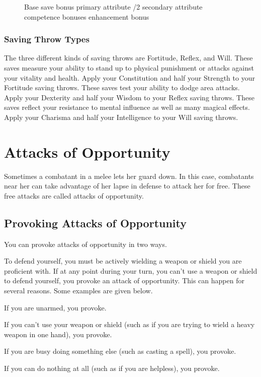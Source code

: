 \begin{figure}[h]
\centering Base save bonus \add primary attribute /2 secondary attribute \add competence bonuses \add enhancement bonus
\end{figure}

\subsubsection{Saving Throw Types}
The three different kinds of saving throws are Fortitude, Reflex, and Will.
 These saves measure your ability to stand up to physical punishment or attacks against your vitality and health. Apply your Constitution and half your Strength to your Fortitude saving throws.
 These saves test your ability to dodge area attacks. Apply your Dexterity and half your Wisdom to your Reflex saving throws.
 These saves reflect your resistance to mental influence as well as many magical effects. Apply your Charisma and half your Intelligence to your Will saving throws.

\section{Attacks of Opportunity}
Sometimes a combatant in a melee lets her guard down. In this case, combatants near her can take advantage of her lapse in defense to attack her for free. These free attacks are called attacks of opportunity.

\subsection{Provoking Attacks of Opportunity}
You can provoke attacks of opportunity in two ways.

 To defend yourself, you must be actively wielding a weapon or shield you are proficient with. If at any point during your turn, you can't use a weapon or shield to defend yourself, you provoke an attack of opportunity. This can happen for several reasons. Some examples are given below.

\begin{itemize*}
    \item If you are unarmed, you provoke.
    \item If you can't use your weapon or shield (such as if you are trying to wield a heavy weapon in one hand), you provoke.
    \item If you are busy doing something else (such as casting a spell), you provoke.
    \item If you can do nothing at all (such as if you are helpless), you provoke.
\end{itemize*}

